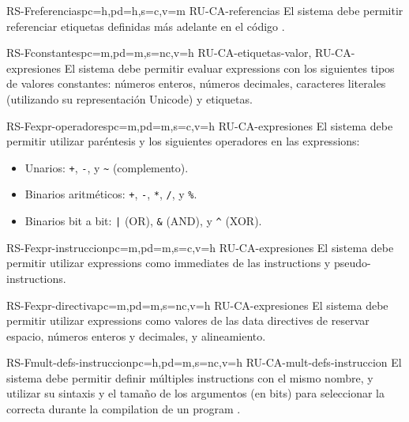 \begin{softwareReq}{RS-F}{referencias}{pc=h,pd=h,s=c,v=m}
    {RU-CA-referencias}
    El sistema debe permitir referenciar etiquetas definidas más adelante en el
    código .
\end{softwareReq}

\begin{softwareReq}{RS-F}{constantes}{pc=m,pd=m,s=nc,v=h}
    {RU-CA-etiquetas-valor, RU-CA-expresiones}
    El sistema debe permitir evaluar \glspl{expression} con los siguientes tipos
    de valores constantes: números enteros, números decimales, caracteres
    literales (utilizando su representación Unicode) y etiquetas.
\end{softwareReq}

\begin{softwareReq}{RS-F}{expr-operadores}{pc=m,pd=m,s=c,v=h}
    {RU-CA-expresiones}
    El sistema debe permitir utilizar paréntesis y los siguientes operadores en
    las \glspl{expression}:
    \begin{itemize}
        \item Unarios: \verb!+!, \verb!-!, y \verb!~! (complemento).
        \item Binarios aritméticos: \verb!+!, \verb!-!, \verb!*!, \verb!/!, y \verb!%!.
        \item Binarios bit a bit: \verb!|! (OR), \verb!&! (AND), y \verb!^! (XOR).
    \end{itemize}
\end{softwareReq}

\begin{softwareReq}{RS-F}{expr-instruccion}{pc=m,pd=m,s=c,v=h}
    {RU-CA-expresiones}
    El sistema debe permitir utilizar \glspl{expression} como \glspl{immediate}
    de las \glspl{instruction} y \glspl{pseudo-instruction}.
\end{softwareReq}

\begin{softwareReq}{RS-F}{expr-directiva}{pc=m,pd=m,s=nc,v=h}
    {RU-CA-expresiones}
    El sistema debe permitir utilizar \glspl{expression} como valores de las
    \glspl{data directive} de reservar espacio, números enteros y decimales, y
    alineamiento.
\end{softwareReq}

\begin{softwareReq}{RS-F}{mult-defs-instruccion}{pc=h,pd=m,s=nc,v=h}
    {RU-CA-mult-defs-instruccion}
    El sistema debe permitir definir múltiples \glspl{instruction} con el mismo
    nombre, y utilizar su sintaxis y el tamaño de los argumentos (en bits) para
    seleccionar la correcta durante la \gls{compilation} de un \gls{program}
    .
\end{softwareReq}

